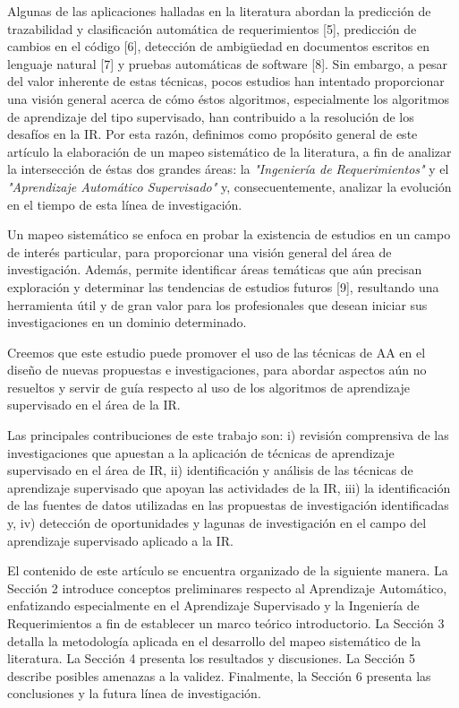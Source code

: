 \documentclass[journal]{IEEEtran}
\begin{document}
Algunas de las aplicaciones halladas en la literatura abordan la predicción de trazabilidad y clasificación automática de requerimientos \cite{Li201725}[5], predicción de cambios en el código \cite{giger2012can}[6], detección de ambigüedad en documentos escritos en lenguaje natural \cite{yang2010extending}[7] y pruebas automáticas de software \cite{Felbinger201623}[8]. Sin embargo, a pesar del valor inherente de estas técnicas, pocos estudios han intentado proporcionar una visión general acerca de cómo éstos algoritmos, especialmente los algoritmos de aprendizaje del tipo supervisado, han contribuido a la resolución de los desafíos en la IR. Por esta razón, definimos como propósito general de este artículo la elaboración de un mapeo sistemático de la literatura, a fin de analizar la intersección de éstas dos grandes áreas: la \textit{"Ingeniería de Requerimientos"} y el \textit{"Aprendizaje Automático Supervisado"} y, consecuentemente, analizar la evolución en el tiempo de esta línea de investigación. 

Un mapeo sistemático se enfoca en probar la existencia de estudios en un campo de interés particular, para proporcionar una visión general del área de investigación. Además, permite identificar áreas temáticas que aún precisan exploración y determinar las tendencias de estudios futuros \cite{petersen2008systematic}[9], resultando una herramienta útil y de gran valor para los profesionales que desean iniciar sus investigaciones en un dominio determinado.

Creemos que este estudio puede promover el uso de las técnicas de AA en el diseño de nuevas propuestas e investigaciones, para abordar aspectos aún no resueltos y servir de guía respecto al uso de los algoritmos de aprendizaje supervisado en el área de la IR.

Las principales contribuciones de este trabajo son: i) revisión comprensiva de las investigaciones que apuestan a la aplicación de técnicas de aprendizaje supervisado en el área de IR, ii) identificación y análisis de las técnicas de aprendizaje supervisado que apoyan las actividades de la IR, iii) la identificación de las fuentes de datos utilizadas en las propuestas de investigación identificadas y, iv) detección de oportunidades y lagunas de investigación en el campo del aprendizaje supervisado aplicado a la IR.

El contenido de este artículo se encuentra organizado de la siguiente manera. La Sección 2 introduce conceptos preliminares respecto al Aprendizaje Automático, enfatizando especialmente en el Aprendizaje Supervisado y la Ingeniería de Requerimientos a fin de establecer un marco teórico introductorio. La Sección 3 detalla la metodología aplicada en el desarrollo del mapeo sistemático de la literatura. La Sección 4 presenta los resultados y discusiones. La Sección 5 describe posibles amenazas a la validez. Finalmente, la Sección 6 presenta las conclusiones y la futura línea de investigación.  
\end{document}
